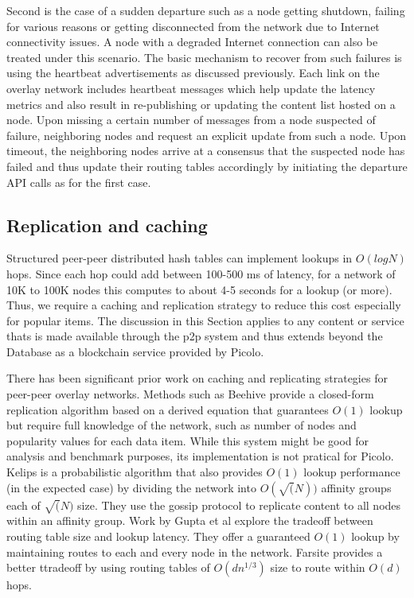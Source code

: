 Second is the case of a sudden departure such as a node getting shutdown, failing for various reasons or getting
disconnected from the network due to Internet connectivity issues. A node with a degraded Internet connection can also
be treated under this scenario. The basic mechanism to recover from such failures is using the heartbeat advertisements
as discussed previously. Each link on the overlay network includes heartbeat messages which help update the latency
metrics and also result in re-publishing or updating the content list hosted on a node. Upon missing a certain number of
messages from a node suspected of failure, neighboring nodes and request an explicit update from such a node. Upon
timeout, the neighboring nodes arrive at a consensus that the suspected node has failed and thus update their routing
tables accordingly by initiating the departure API calls as for the first case.

\subsection{Replication and caching}
\label{net:replication}
Structured peer-peer distributed hash tables can implement lookups in \( O(log N)\) hops. Since each hop could add between 100-500
ms of latency, for a network of 10K to 100K nodes this computes to about 4-5 seconds for a lookup (or more). Thus, we
require a caching and replication strategy to reduce this cost especially for popular items. The discussion in this
Section applies to any content or service thats is made available through the p2p system and thus extends beyond the
Database as a blockchain service provided by Picolo.

There has been significant prior work on caching and replicating strategies for peer-peer overlay networks. Methods such
as Beehive \cite{beehive} provide a closed-form replication algorithm based on a derived equation that guarantees
\(O(1)\) lookup but require full knowledge of the network, such as number of nodes and popularity values for each data
item. While this system might be good for analysis and benchmark purposes, its implementation is not pratical for
Picolo. Kelips \cite{kelips} is a probabilistic algorithm that also provides \(O(1)\) lookup performance (in the
expected case) by dividing the network into \(O(\sqrt(N))\) affinity groups each of \(\sqrt(N)\) size. They use the
gossip protocol to replicate content to all nodes within an affinity group. Work by Gupta et al \cite{one_hop_lookup}
explore the tradeoff between routing table size and lookup latency. They offer a guaranteed \(O(1)\) lookup by
maintaining routes to each and every node in the network. Farsite \cite{farsite} provides a better ttradeoff by using
routing tables of \(O(dn^{1/3})\) size to route within \(O(d)\) hops.

